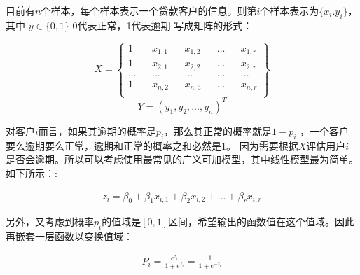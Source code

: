 \documentclass[12pt]{article}
\begin{document}
\begin{flushleft}
	\noindent\qquad 目前有$n$个样本，每个样本表示一个贷款客户的信息。则第$i$个样本表示为$\{x_i.y_i\}$，其中 $y\in \{0,1\}$ 0代表正常，1代表逾期
	写成矩阵的形式：
	
	
\end{flushleft}

$$X = \left \{ 
\begin{aligned}
1  &&  x_{1,1} && x_{1,2} && ... && x_{1,r} \\
1  &&  x_{2,1} && x_{2,2} && ... && x_{2,r} \\ 
...  &&  ... && ... && ... && ... \\  
1 &&  x_{n,2} && x_{n,3} && ... && x_{n,r} \\
\end{aligned}\right\}  
$$
$$
Y = (y_1,y_2,...,y_n)^T 
$$




\begin{flushleft}
	\noindent\qquad 对客户$i$而言，如果其逾期的概率是$p_i$，那么其正常的概率就是$1-p_i$ ，一个客户要么逾期要么正常，逾期和正常的概率之和必然是1。
	因为需要根据$X$评估用户$i$是否会逾期。所以可以考虑使用最常见的广义可加模型，其中线性模型最为简单。
	如下所示：:
	
\end{flushleft}



\begin{align}
	z_i=\beta_0+\beta_1 x_{i,1}+\beta_2 x_{i,2}+...+\beta_r x_{i,r} \tag{4}
\end{align}



\begin{flushleft}
	\noindent\qquad 另外，又考虑到概率$p_i$的值域是$[0,1]$区间，希望输出的函数值在这个值域。因此再嵌套一层函数以变换值域： 
	
\end{flushleft}



\begin{align}
    P_i=\frac{e^{z_i}}{1+e^{z_i}}=\frac{1}{1+e^{-z_i}}  \tag{5}
\end{align}
\end{document}
